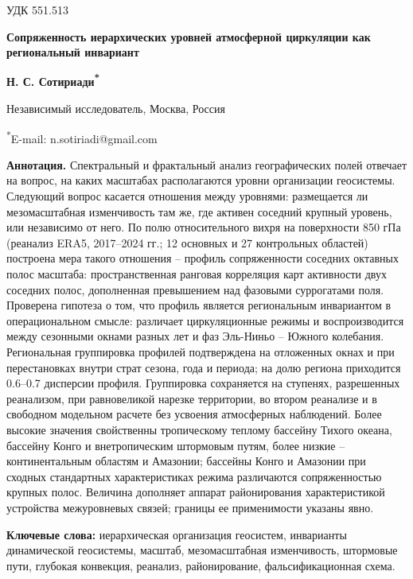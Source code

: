 \documentclass[12pt,a4paper]{article}
\begin{document}
\noindent УДК 551.513

\begin{center}
{\large\bfseries Сопряженность иерархических уровней атмосферной циркуляции как региональный инвариант}

\medskip
{\bfseries Н. С. Сотириади\textsuperscript{*}}

Независимый исследователь, Москва, Россия

\textsuperscript{*}E-mail: n.sotiriadi@gmail.com
\end{center}

\begin{singlespace}
\noindent\textbf{Аннотация.} Спектральный и фрактальный анализ географических полей отвечает на вопрос, на каких масштабах располагаются уровни организации геосистемы. Следующий вопрос касается отношения между уровнями: размещается ли мезомасштабная изменчивость там же, где активен соседний крупный уровень, или независимо от него. По полю относительного вихря на поверхности 850 гПа (реанализ ERA5, 2017--2024 гг.; 12 основных и 27 контрольных областей) построена мера такого отношения -- профиль сопряженности соседних октавных полос масштаба: пространственная ранговая корреляция карт активности двух соседних полос, дополненная превышением над фазовыми суррогатами поля. Проверена гипотеза о том, что профиль является региональным инвариантом в операциональном смысле: различает циркуляционные режимы и воспроизводится между сезонными окнами разных лет и фаз Эль-Ниньо -- Южного колебания. Региональная группировка профилей подтверждена на отложенных окнах и при перестановках внутри страт сезона, года и периода; на долю региона приходится 0.6--0.7 дисперсии профиля. Группировка сохраняется на ступенях, разрешенных реанализом, при равновеликой нарезке территории, во втором реанализе и в свободном модельном расчете без усвоения атмосферных наблюдений. Более высокие значения свойственны тропическому теплому бассейну Тихого океана, бассейну Конго и внетропическим штормовым путям, более низкие -- континентальным областям и Амазонии; бассейны Конго и Амазонии при сходных стандартных характеристиках режима различаются сопряженностью крупных полос. Величина дополняет аппарат районирования характеристикой устройства межуровневых связей; границы ее применимости указаны явно.

\smallskip
\noindent\textbf{Ключевые слова:} иерархическая организация геосистем, инварианты динамической геосистемы, масштаб, мезомасштабная изменчивость, штормовые пути, глубокая конвекция, реанализ, районирование, фальсификационная схема.
\end{singlespace}
\end{document}
